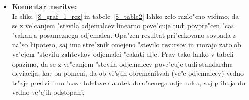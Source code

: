 \begin{itemize}
    \pagebreak
	\item \textbf{Komentar meritve: } \\
		Iz slike~\ref{8_graf_1_rez} in tabele~\ref{8_table2} lahko zelo razlo"cno vidimo, da se z ve"canjem "stevila odjemalcev linearno pove"cuje tudi povpre"cen "cas "cakanja posameznega odjemalca. Opa"zen rezultat pri"cakovano sovpada z na"so hipotezo, saj ima stre"znik omejeno "stevilo resursov in morajo zato ob ve"cjem "stevilu zahtevkov odjemalci  "cakati dlje. Prav tako lahko v tabeli opazimo, da se z ve"canjem "stevila odjemalcev pove"cuje tudi standardna deviacija, kar pa pomeni, da ob vi"sjih obremenitvah (ve"c odjemalcev) vedno te"zje predvidimo "cas obdelave datotek dolo"cenega odjemalca, saj prihaja do vedno ve"cjih odstopanj.
\end{itemize}

\newpage
